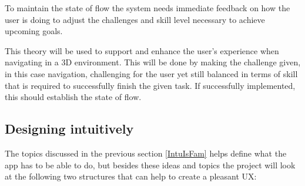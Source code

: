 To maintain the state of flow the system needs immediate feedback on how the user is doing to adjust the challenges and skill level necessary to achieve upcoming goals. \cite{Flow} 

This theory will be used to support and enhance the user's experience when navigating in a 3D environment. This will be done by making the challenge given, in this case navigation, challenging for the user yet still balanced in terms of skill that is required to successfully finish the given task. If successfully implemented, this should establish the state of flow. \cite{Flow} 
\subsection{Designing intuitively}\label{DesigningIntuitively}
The topics discussed in the previous section \ref{IntuIsFam} helps define what the app has to be 
able to do, but besides these ideas and topics the project will look at the following two structures that can help to create a pleasant UX:
